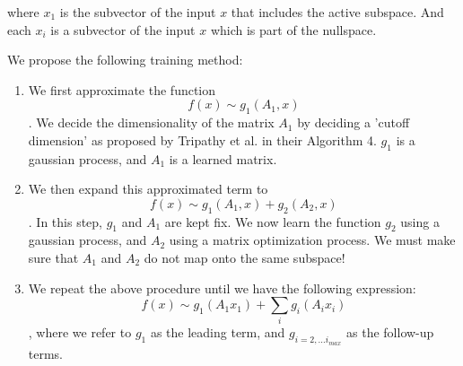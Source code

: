 where $x_1$ is the subvector of the input $x$ that includes the active subspace.
And each $x_i$ is a subvector of the input $x$ which is part of the nullspace.

We propose the following training method:

\begin{enumerate}
\item We first approximate the function 
$$ f(x) \sim g_1(A_1, x) $$.
We decide the dimensionality of the matrix $A_1$ by deciding a 'cutoff dimension' as proposed by Tripathy et al. in their Algorithm 4.
$g_1$ is a gaussian process, and $A_1$ is a learned matrix.

\item We then expand this approximated term to
$$ f(x) \sim g_1(A_1, x)  + g_2(A_2, x)$$.
In this step, $g_1$ and $A_1$ are kept fix.
We now learn the function $g_2$ using a gaussian process, and $A_2$ using a matrix optimization process.
We must make sure that $A_1$ and $A_2$ do not map onto the same subspace!

\item We repeat the above procedure until we have the following expression:
$$f(x) \sim g_1(A_1 x_1) + \sum_{i} g_i(A_i x_i)$$, where we refer to $g_1$ as the leading term, and $g_{i=2,...i_{max}}$ as the follow-up terms.


\end{enumerate}






